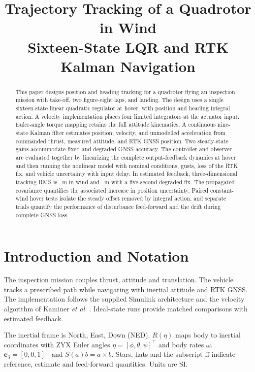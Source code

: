 \documentclass[conference]{IEEEtran}
\newcommand{\e}{\mathbf e_3}
\begin{document}
\title{Trajectory Tracking of a Quadrotor in Wind\\Sixteen-State LQR and RTK Kalman Navigation}
\author{
}
\maketitle
\begin{abstract}
This paper designs position and heading tracking for a quadrotor flying
an inspection mission with take-off, two figure-eight laps, and landing.
The design uses a single sixteen-state linear quadratic regulator at
hover, with position and heading integral action. A velocity
implementation places four limited integrators at the actuator input.
Euler-angle torque mapping retains the full attitude kinematics.
A continuous nine-state Kalman filter estimates position, velocity, and
unmodelled acceleration from commanded thrust, measured attitude, and
RTK GNSS position. Two steady-state gains accommodate fixed and degraded
GNSS accuracy. The controller and observer are evaluated together by
linearizing the complete output-feedback dynamics at hover and then
running the nonlinear model with nominal conditions, gusts, loss of
the RTK fix, and vehicle uncertainty with input delay. In estimated
feedback, three-dimensional tracking RMS is \windRms~m in wind and
\rtkRms~m with a five-second degraded fix. The propagated covariance
quantifies the associated increase in position uncertainty. Paired
constant-wind hover tests isolate the steady offset removed by integral
action, and separate trials quantify the performance of disturbance
feed-forward and the drift during complete GNSS loss.
\end{abstract}

\section{Introduction and Notation}
The inspection mission couples thrust, attitude and translation.
The vehicle tracks a prescribed path while navigating with inertial
attitude and RTK GNSS. The implementation follows the supplied
Simulink architecture and the velocity algorithm of Kaminer
\emph{et al.} \cite{kaminer}. Ideal-state runs provide matched
comparisons with estimated feedback.

The inertial frame is North, East, Down (NED).
\(R(\eta)\) maps body to inertial coordinates with ZYX Euler
angles \(\eta=[\phi,\theta,\psi]^\top\) and body rates \(\omega\).
\(\e=[0,0,1]^\top\) and \(S(a)b=a\times b\).
Stars, hats and the subscript \(\mathrm{ff}\) indicate reference,
estimate and feed-forward quantities. Units are SI.
\end{document}
